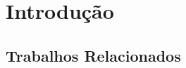 \chapter{Introdução}
\label{cap:introducao}

\section{Trabalhos Relacionados}
\label{sec:trabalhosRelacionados}

%
%
%
